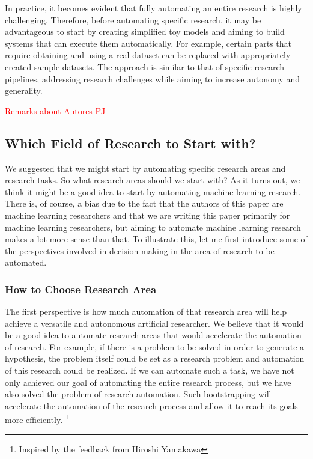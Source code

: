 In practice, it becomes evident that fully automating an entire research is highly challenging. Therefore, before automating specific research, it may be advantageous to start by creating simplified toy models and aiming to build systems that can execute them automatically. For example, certain parts that require obtaining and using a real dataset can be replaced with appropriately created sample datasets. The approach is similar to that of specific research pipelines, addressing research challenges while aiming to increase autonomy and generality.

\textcolor{red}{Remarks about Autores PJ}

\subsection{Which Field of Research to Start with?}
We suggested that we might start by automating specific research areas and research tasks. So what research areas should we start with? As it turns out, we think it might be a good idea to start by automating machine learning research. There is, of course, a bias due to the fact that the authors of this paper are machine learning researchers and that we are writing this paper primarily for machine learning researchers, but aiming to automate machine learning research makes a lot more sense than that. To illustrate this, let me first introduce some of the perspectives involved in decision making in the area of research to be automated.

\subsubsection{How to Choose Research Area}
The first perspective is how much automation of that research area will help achieve a versatile and autonomous artificial researcher. We believe that it would be a good idea to automate research areas that would accelerate the automation of research. For example, if there is a problem to be solved in order to generate a hypothesis, the problem itself could be set as a research problem and automation of this research could be realized. If we can automate such a task, we have not only achieved our goal of automating the entire research process, but we have also solved the problem of research automation. Such bootstrapping will accelerate the automation of the research process and allow it to reach its goals more efficiently. \footnote{
Inspired by the feedback from Hiroshi Yamakawa
}

